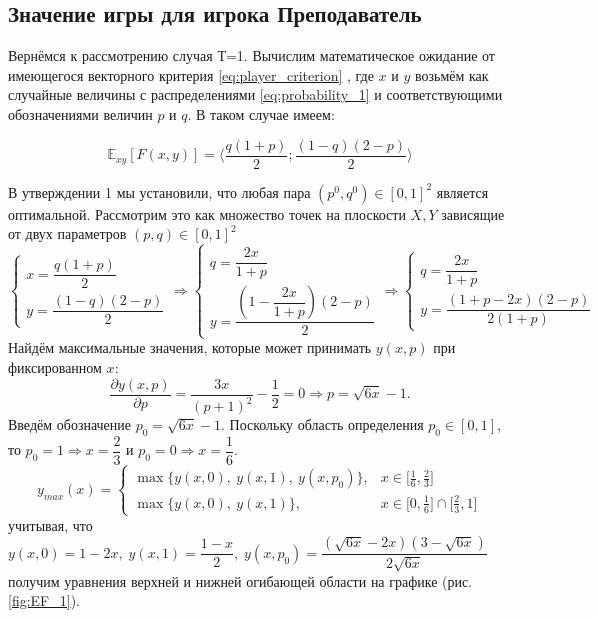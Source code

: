 \subsection{Значение игры для игрока Преподаватель}

Вернёмся к рассмотрению случая Т=1.
Вычислим математическое ожидание от имеющегося векторного критерия 
\eqref{eq:player_criterion}
, где $x$ и $y$ возьмём как случайные величины с распределениями 
\eqref{eq:probability_1}
и соответствующими обозначениями величин $p$ и $q$. В таком случае имеем:

$$
	\mathbb{E}_{xy} [F(x,y)]=
	\Big \langle
		\dfrac{q(1+p)}{2};
		\dfrac{(1-q)(2-p)}{2}
	\Big\rangle
$$

В утверждении 1 мы установили, что любая пара
$(p^0, q^0) \in [0, 1]^{2}$ является оптимальной. 
Рассмотрим это как множество точек на плоскости $X,Y$ зависящие от двух
параметров $(p,q)\in[0,1]^2$
$$
	\begin{cases}
		x = \dfrac{q(1 + p)}{2} \\
		y = \dfrac{(1 - q)(2 - p)}{2}  
	\end{cases}
	\Rightarrow
	\begin{cases}
		q = \dfrac{2x}{1 + p} \\
		y = \dfrac{(1 - \dfrac{2x}{1 + p})(2 - p)}{2}		
	\end{cases}
	\Rightarrow
	\begin{cases}
		q = \dfrac{2x}{1 + p} \\
		y = \dfrac{(1 + p - 2x)(2 - p)}{2(1 + p)}
	\end{cases}
$$
Найдём максимальные значения, которые может принимать $y(x, p)$ при фиксированном $x$:
$$
	\dfrac{\partial y(x, p)}{\partial p}=\frac{3x}{(p+1)^2} - \frac{1}{2} = 0 
	\Rightarrow
	p = \sqrt{6x} - 1.
$$
Введём обозначение $p_0 = \sqrt{6x} - 1$. Поскольку область определения 
$p_0 \in [0, 1]$, то $p_0 = 1 \Rightarrow x = \dfrac{2}{3}$ и 
$p_0 = 0 \Rightarrow x = \dfrac{1}{6}$.
$$
	y_{max}(x) = 
	\begin{cases}
		\max \{ y(x, 0), \: y(x, 1), \: y(x, p_0) \}, & 
		x \in \big[ \frac{1}{6}, \frac{2}{3} \big]
		\\
		\max \{ y(x, 0), \: y(x, 1) \}, &
		x \in \big[0, \frac{1}{6} \big] \cap \big[\frac{2}{3}, 1\big]
	\end{cases}
$$
учитывая, что
$
	y(x, 0) = 1 - 2x, \;
	y(x, 1) = \dfrac{1 - x}{2}, \;  	
	y(x, p_0) = \dfrac{(\sqrt{6x} - 2x)(3 - \sqrt{6x})}{2 \sqrt{6x}}
$
получим уравнения верхней и нижней огибающей области на графике (рис. 
\ref{fig:EF_1}).


